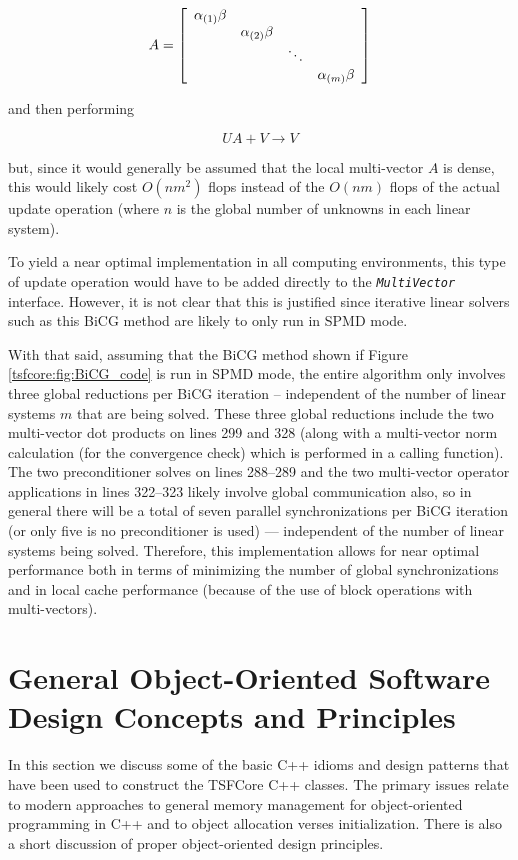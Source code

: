 \[
A = {\bmat{cccc} \alpha_{(1)} \beta \\ & \alpha_{(2)} \beta \\ & & \ddots \\ & & & \alpha_{(m)} \beta \emat}
\]

and then performing

\[
U A + V \rightarrow V
\]

but, since it would generally be assumed that the local multi-vector
$A$ is dense, this would likely cost $O(n m^2)$ flops instead of the
$O(n m)$ flops of the actual update operation (where $n$ is the global
number of unknowns in each linear system).

To yield a near optimal implementation in all computing environments,
this type of update operation would have to be added directly to the
\texttt{\textit{Multi\-Vector}} interface.  However, it is not clear
that this is justified since iterative linear solvers such as this
BiCG method are likely to only run in SPMD mode.

With that said, assuming that the BiCG method shown if Figure
\ref{tsfcore:fig:BiCG_code} is run in SPMD mode, the entire
algorithm only involves three global reductions per BiCG iteration --
independent of the number of linear systems $m$ that are being solved.
These three global reductions include the two multi-vector dot
products on lines 299 and 328 (along with a multi-vector norm
calculation (for the convergence check) which is performed in a
calling function).  The two preconditioner solves on lines 288--289
and the two multi-vector operator applications in lines 322--323
likely involve global communication also, so in general there will be
a total of seven parallel synchronizations per BiCG iteration (or only
five is no preconditioner is used) --- independent of the number of
linear systems being solved.  Therefore, this implementation allows
for near optimal performance both in terms of minimizing the number of
global synchronizations and in local cache performance (because of the
use of block operations with multi-vectors).

%
\section{General Object-Oriented Software Design Concepts and Principles}
\label{tsfcore:sec:general_software_concepts}
%
 
In this section we discuss some of the basic C++ idioms and design
patterns that have been used to construct the TSFCore C++ classes.  The
primary issues relate to modern approaches to general memory
management for object-oriented programming in C++ and to object
allocation verses initialization.  There is also a short discussion of
proper object-oriented design principles.

